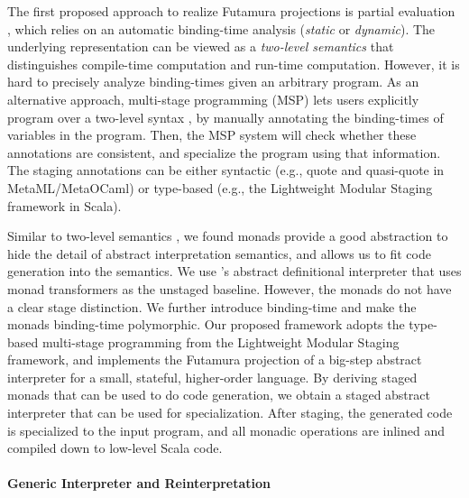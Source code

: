 The first proposed approach to realize Futamura projections is partial
evaluation \cite{DBLP:books/daglib/0072559}, which relies on an automatic
binding-time analysis (\textit{static} or \textit{dynamic}).  The underlying
representation can be viewed as a \textit{two-level semantics}
\cite{NIELSON1989117, NIELSON198859} that distinguishes compile-time
computation and run-time computation.
However, it is hard to precisely analyze binding-times given an arbitrary
program. As an alternative approach, multi-stage programming (MSP)
\cite{taha1999multi, DBLP:conf/pepm/TahaS97} lets users explicitly program over
a two-level syntax \cite{Nielson:1992:TFL:130665}, by manually
annotating the binding-times of variables in the program. Then, the MSP system
will check whether these annotations are consistent, and specialize the program
using that information. The staging annotations can be either syntactic (e.g.,
quote and quasi-quote in MetaML/MetaOCaml) or type-based (e.g., the Lightweight
Modular Staging framework \cite{DBLP:conf/gpce/RompfO10} in Scala).

Similar to two-level semantics \cite{NIELSON1989117}, we found
monads provide a good abstraction to hide the detail of abstract
interpretation semantics, and allows us to fit code generation into
the semantics. We use \citet{DBLP:journals/pacmpl/DaraisLNH17}'s
abstract definitional interpreter that uses monad transformers as the
unstaged baseline. However, the monads do not have a clear stage distinction.
We further introduce binding-time and make the monads binding-time polymorphic.
Our proposed framework adopts the type-based multi-stage programming from the
Lightweight Modular Staging framework, and implements the Futamura projection
of a big-step abstract interpreter for a small, stateful, higher-order
language. By deriving staged monads that can be used to do code generation, we
obtain a staged abstract interpreter that can be used for specialization. After
staging, the generated code is specialized to the input program, and all
monadic operations are inlined and compiled down to low-level Scala code.



\paragraph{Generic Interpreter and Reinterpretation}

